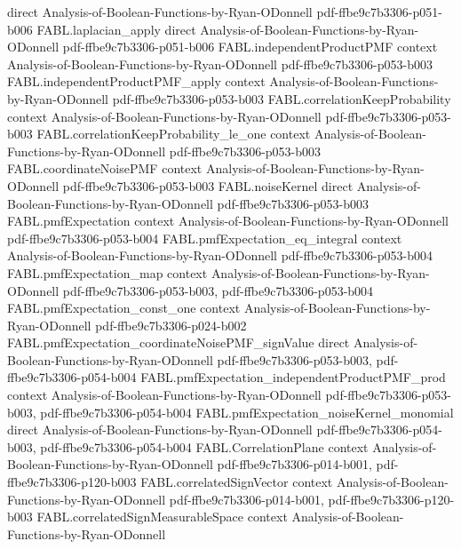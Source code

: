 \begin{theorem}
  {direct}
  {Analysis-of-Boolean-Functions-by-Ryan-ODonnell}
  {pdf-ffbe9c7b3306-p051-b006}
\proofstep
  {FABL.laplacian_apply}
  {direct}
  {Analysis-of-Boolean-Functions-by-Ryan-ODonnell}
  {pdf-ffbe9c7b3306-p051-b006}
\proofstep
  {FABL.independentProductPMF}
  {context}
  {Analysis-of-Boolean-Functions-by-Ryan-ODonnell}
  {pdf-ffbe9c7b3306-p053-b003}
\proofstep
  {FABL.independentProductPMF_apply}
  {context}
  {Analysis-of-Boolean-Functions-by-Ryan-ODonnell}
  {pdf-ffbe9c7b3306-p053-b003}
\proofstep
  {FABL.correlationKeepProbability}
  {context}
  {Analysis-of-Boolean-Functions-by-Ryan-ODonnell}
  {pdf-ffbe9c7b3306-p053-b003}
\proofstep
  {FABL.correlationKeepProbability_le_one}
  {context}
  {Analysis-of-Boolean-Functions-by-Ryan-ODonnell}
  {pdf-ffbe9c7b3306-p053-b003}
\proofstep
  {FABL.coordinateNoisePMF}
  {context}
  {Analysis-of-Boolean-Functions-by-Ryan-ODonnell}
  {pdf-ffbe9c7b3306-p053-b003}
\proofstep
  {FABL.noiseKernel}
  {direct}
  {Analysis-of-Boolean-Functions-by-Ryan-ODonnell}
  {pdf-ffbe9c7b3306-p053-b003}
\proofstep
  {FABL.pmfExpectation}
  {context}
  {Analysis-of-Boolean-Functions-by-Ryan-ODonnell}
  {pdf-ffbe9c7b3306-p053-b004}
\proofstep
  {FABL.pmfExpectation_eq_integral}
  {context}
  {Analysis-of-Boolean-Functions-by-Ryan-ODonnell}
  {pdf-ffbe9c7b3306-p053-b004}
\proofstep
  {FABL.pmfExpectation_map}
  {context}
  {Analysis-of-Boolean-Functions-by-Ryan-ODonnell}
  {pdf-ffbe9c7b3306-p053-b003,
    pdf-ffbe9c7b3306-p053-b004}
\proofstep
  {FABL.pmfExpectation_const_one}
  {context}
  {Analysis-of-Boolean-Functions-by-Ryan-ODonnell}
  {pdf-ffbe9c7b3306-p024-b002}
\proofstep
  {FABL.pmfExpectation_coordinateNoisePMF_signValue}
  {direct}
  {Analysis-of-Boolean-Functions-by-Ryan-ODonnell}
  {pdf-ffbe9c7b3306-p053-b003,
    pdf-ffbe9c7b3306-p054-b004}
\proofstep
  {FABL.pmfExpectation_independentProductPMF_prod}
  {context}
  {Analysis-of-Boolean-Functions-by-Ryan-ODonnell}
  {pdf-ffbe9c7b3306-p053-b003,
    pdf-ffbe9c7b3306-p054-b004}
\proofstep
  {FABL.pmfExpectation_noiseKernel_monomial}
  {direct}
  {Analysis-of-Boolean-Functions-by-Ryan-ODonnell}
  {pdf-ffbe9c7b3306-p054-b003,
    pdf-ffbe9c7b3306-p054-b004}
\proofstep
  {FABL.CorrelationPlane}
  {context}
  {Analysis-of-Boolean-Functions-by-Ryan-ODonnell}
  {pdf-ffbe9c7b3306-p014-b001,
    pdf-ffbe9c7b3306-p120-b003}
\proofstep
  {FABL.correlatedSignVector}
  {context}
  {Analysis-of-Boolean-Functions-by-Ryan-ODonnell}
  {pdf-ffbe9c7b3306-p014-b001,
    pdf-ffbe9c7b3306-p120-b003}
\proofstep
  {FABL.correlatedSignMeasurableSpace}
  {context}
  {Analysis-of-Boolean-Functions-by-Ryan-ODonnell}

\end{theorem}

